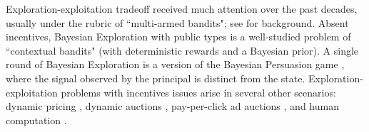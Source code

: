 Exploration-exploitation tradeoff received much attention over the past decades, usually under the rubric of ``multi-armed bandits"; see  \cite{Bubeck-survey12,Gittins-book11} for background. Absent incentives, Bayesian Exploration with public types is a well-studied problem of ``contextual bandits" (with deterministic rewards and a Bayesian prior). A single round of Bayesian Exploration is a version of the Bayesian Persuasion game \cite{Kamenica-aer11}, where the signal observed by the principal is distinct from the state. Exploration-exploitation problems with incentives issues arise in several other scenarios: dynamic pricing
    \cite{KleinbergL03,BZ09,BwK-focs13},
dynamic auctions
    \cite{AtheySegal-econometrica13,DynPivot-econometrica10,Kakade-pivot-or13},
pay-per-click ad auctions
    \cite{MechMAB-ec09,DevanurK09,Transform-ec10-jacm},
and human computation
    \cite{RepeatedPA-ec14,Ghosh-itcs13,Krause-www13}.


